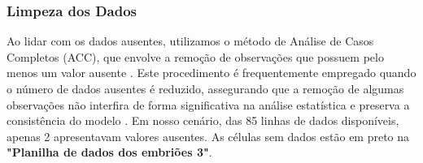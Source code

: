 \subsubsection{Limpeza dos Dados}
Ao lidar com os dados ausentes, utilizamos o método de Análise de Casos Completos (ACC), que envolve a remoção de observações que possuem pelo menos um valor ausente \cite{camargos2011}. Este procedimento é frequentemente empregado quando o número de dados ausentes é reduzido, assegurando que a remoção de algumas observações não interfira de forma significativa na análise estatística e preserva a consistência do modelo \cite{camargos2011}. Em nosso cenário, das 85 linhas de dados disponíveis, apenas 2 apresentavam valores ausentes. As células sem dados estão em preto na \textbf{"Planilha de dados dos embriões 3"}. 




